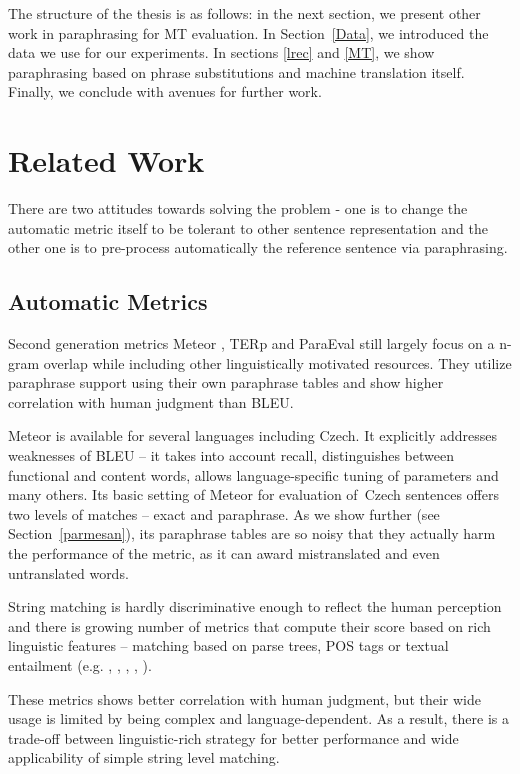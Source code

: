 \documentclass[11pt]{article}
\def\Sref#1{Section~\ref{#1}}
\begin{document}
The structure of the thesis is as follows: in the next section, we present 
other work in paraphrasing for MT evaluation. In \Sref{Data}, we introduced
the data we use for our experiments. In sections \ref{lrec} and \ref{MT}, 
we show paraphrasing based on phrase substitutions and machine translation 
itself. Finally, we conclude with avenues for further work.

\section{Related Work}
There are two attitudes towards solving the problem - one is to change the 
automatic metric itself to be tolerant to other sentence representation and the
other one is to pre-process automatically the reference sentence via 
paraphrasing.

\subsection{Automatic Metrics}
Second generation metrics Meteor \cite{meteor-wmt:2014}, TERp \cite{terp} and 
ParaEval \cite{paraeval2} still largely focus on a n-gram overlap while 
including other linguistically motivated resources. They utilize paraphrase 
support using their own paraphrase tables and show higher correlation with 
human judgment than BLEU.

Meteor is available for several languages including Czech. It explicitly 
addresses weaknesses of BLEU -- it takes into account recall, distinguishes 
between functional and content words, allows language-specific tuning of 
parameters and many others. Its  basic setting of Meteor for evaluation 
of~Czech sentences offers two levels of matches -- exact and paraphrase. As we 
show further (see \Sref{parmesan}), its paraphrase tables are so noisy that 
they actually harm the performance of the metric, as it can award mistranslated 
and even untranslated words.

String matching is hardly discriminative enough to reflect the human perception 
and there is growing number of metrics that compute their score based on rich 
linguistic features -- matching based on parse trees, POS tags or textual 
entailment (e.g. , , 
, , ). 

These metrics shows better correlation with human judgment, but their wide 
usage is limited by being complex and language-dependent. As a result, there is
a trade-off between linguistic-rich strategy for better performance and 
wide applicability of simple string level matching.
\end{document}
